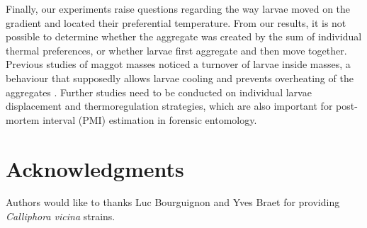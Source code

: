 Finally, our experiments raise questions regarding the way larvae moved on the gradient and located their preferential temperature. From our results, it is not possible to determine whether the aggregate was created by the sum of individual thermal preferences, or whether larvae first aggregate and then move together. Previous studies of maggot masses noticed a turnover of larvae inside masses, a behaviour that supposedly allows larvae cooling and prevents overheating of the aggregates \citep{charabidze_discontinuous_2013,rivers_heat_2015}. Further studies need to be conducted on individual larvae displacement and thermoregulation strategies, which are also important for post-mortem interval (PMI) estimation in forensic entomology. 

	\section{Acknowledgments}   
Authors would like to thanks Luc Bourguignon and Yves Braet for providing \textit{Calliphora vicina} strains.     
        
        
\clearpage    
    
    